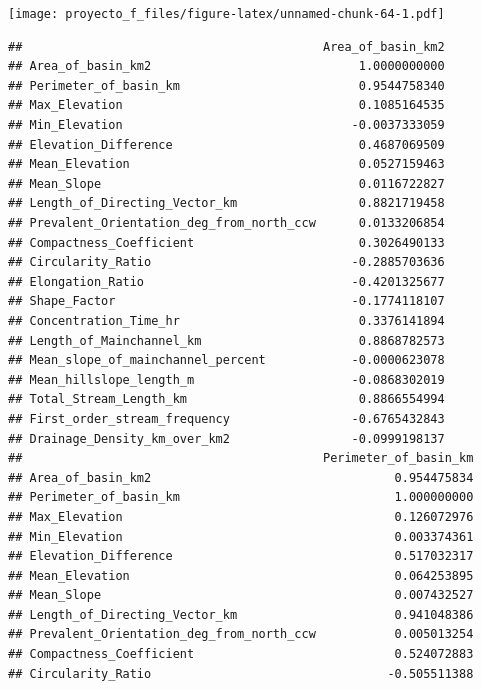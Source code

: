 \documentclass[11pt,]{article}
\newenvironment{Shaded}{\begin{snugshade}}{\end{snugshade}}
\newcommand{\StringTok}[1]{\textcolor[rgb]{0.31,0.60,0.02}{#1}}
\newcommand{\OperatorTok}[1]{\textcolor[rgb]{0.81,0.36,0.00}{\textbf{#1}}}
\newcommand{\NormalTok}[1]{#1}
\begin{document}
\texttt{[image: proyecto\_f\_files/figure-latex/unnamed-chunk-64-1.pdf]}

\begin{Shaded}
\end{Shaded}

\begin{verbatim}
##                                          Area_of_basin_km2
## Area_of_basin_km2                             1.0000000000
## Perimeter_of_basin_km                         0.9544758340
## Max_Elevation                                 0.1085164535
## Min_Elevation                                -0.0037333059
## Elevation_Difference                          0.4687069509
## Mean_Elevation                                0.0527159463
## Mean_Slope                                    0.0116722827
## Length_of_Directing_Vector_km                 0.8821719458
## Prevalent_Orientation_deg_from_north_ccw      0.0133206854
## Compactness_Coefficient                       0.3026490133
## Circularity_Ratio                            -0.2885703636
## Elongation_Ratio                             -0.4201325677
## Shape_Factor                                 -0.1774118107
## Concentration_Time_hr                         0.3376141894
## Length_of_Mainchannel_km                      0.8868782573
## Mean_slope_of_mainchannel_percent            -0.0000623078
## Mean_hillslope_length_m                      -0.0868302019
## Total_Stream_Length_km                        0.8866554994
## First_order_stream_frequency                 -0.6765432843
## Drainage_Density_km_over_km2                 -0.0999198137
##                                          Perimeter_of_basin_km
## Area_of_basin_km2                                  0.954475834
## Perimeter_of_basin_km                              1.000000000
## Max_Elevation                                      0.126072976
## Min_Elevation                                      0.003374361
## Elevation_Difference                               0.517032317
## Mean_Elevation                                     0.064253895
## Mean_Slope                                         0.007432527
## Length_of_Directing_Vector_km                      0.941048386
## Prevalent_Orientation_deg_from_north_ccw           0.005013254
## Compactness_Coefficient                            0.524072883
## Circularity_Ratio                                 -0.505511388

\end{verbatim}
\end{document}
